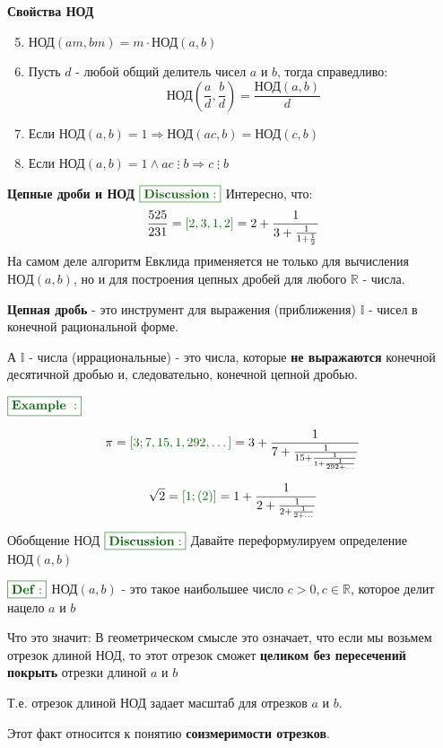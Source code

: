 \documentclass[8pt, aspectratio=169]{beamer}
\newcommand{\Def}{{\color{darkgreen}\boxed{\color{darkgreen}\mathbf{Def:}}}}
\newcommand{\Ex}[1]{{\color{darkgreen}\boxed{\color{darkgreen}\mathbf{Example~#1:}}}}
\newcommand{\Disc}{{\color{darkgreen}\boxed{\color{darkgreen}\mathbf{Discussion:}}}}
\begin{document}
\begin{frame}{\textbf{Свойства НОД}}
\begin{enumerate}
\setcounter{enumi}{4}
\item $\text{НОД}(am, bm) = m\cdot \text{НОД}(a, b)$

\item Пусть $d$ - любой общий делитель чисел $a$ и $b$, тогда справедливо:
\[
\text{НОД}\left(\frac{a}{d}, \frac{b}{d}\right) = \frac{\text{НОД}(a, b)}{d}
\]

\item Если $\text{НОД}(a, b) = 1 \Rightarrow \text{НОД}(ac, b) = \text{НОД}(c, b)$
\item Если $\text{НОД}(a, b) = 1 \land ac\mathbin{\vdots}b \Rightarrow c \mathbin{\vdots} b$
\end{enumerate}
\end{frame}

\begin{frame}{\textbf{Цепные дроби и НОД}}
$\Disc$ Интересно, что:
\[
\frac{525}{231} = {\color{darkgreen}[2, 3, 1, 2]} = 2 + {\frac{1}{3 + \frac{1}{1 + \frac{1}{2}}}}
\]
На самом деле алгоритм Евклида применяется не только для вычисления $НОД(a, b)$, но и для построения цепных дробей для любого $\mathbb{R}$ - числа.

\textbf{Цепная дробь} - это инструмент для выражения (приближения) $\mathbb{I}$ - чисел в конечной рациональной форме.

А $\mathbb{I}$ - числа (иррациональные) - это числа, которые \textbf{не выражаются} конечной десятичной дробью и, следовательно, конечной цепной дробью.

$\Ex{}$

\[
\pi = {\color{darkgreen}[3; 7, 15, 1, 292, \dots]} = 3 + \frac{1}{7 + \frac{1}{15 + \frac{1}{1 + \frac{1}{292 + \dots}}}}
\]

\[\sqrt{2} = {\color{darkgreen}[1; (2)]} = 1 + \frac{1}{2 + \frac{1}{2 + \frac{1}{2 + \dots}}}\]
\end{frame}

\begin{frame}{Обобщение НОД}
$\Disc$ Давайте переформулируем определение $\text{НОД}(a, b)$

\vspace{0.5cm}

$\Def$ $\text{НОД}(a, b)$ - это такое наибольшее число $c > 0, c \in \mathbb{R}$, которое делит нацело $a$ и $b$

Что это значит:
В геометрическом смысле это означает, что если мы возьмем отрезок длиной $\text{НОД}$, то этот отрезок сможет \textbf{целиком без пересечений покрыть} отрезки длиной $a$ и $b$

\vspace{0.5cm}

Т.е. отрезок длиной $\text{НОД}$ задает масштаб для отрезков $a$ и $b$.

\vspace{0.5cm}

Этот факт относится к понятию \textbf{соизмеримости отрезков}.
\end{frame}
\end{document}
